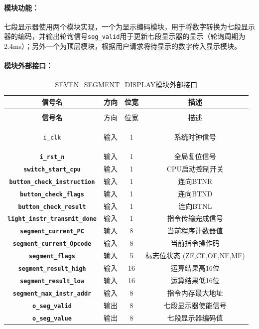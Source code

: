\documentclass[lang=cn,a4paper,newtx]{elegantpaper}
\begin{document}
\paragraph{模块功能：}
七段显示器使用两个模块实现，一个为显示编码模块，用于将数字转换为七段显示器的编码，并输出轮询信号\texttt{seg\_valid}用于更新七段显示器的显示（轮询周期为2.4ms）；另外一个为顶层模块，根据用户请求将待显示的数字传入显示模块。
\paragraph{模块外部接口：}
\begin{longtable}{>{\bfseries}c c c c}
  \caption{SEVEN\_SEGMENT\_DISPLAY模块外部接口} \\ 
  \toprule
  信号名 & 方向 & 位宽 & 描述 \\ 
  \midrule
  \endfirsthead

  \multicolumn{4}{l}{\textbf{（续表）SEVEN\_SEGMENT\_DISPLAY模块外部接口}} \\ 
  \toprule
  信号名 & 方向 & 位宽 & 描述 \\ 
  \midrule
  \endhead

  \texttt{i\_clk} & 输入 & 1 & 系统时钟信号 \\ 
  \texttt{i\_rst\_n} & 输入 & 1 & 全局复位信号 \\ 
  \texttt{switch\_start\_cpu} & 输入 & 1 & CPU启动控制开关 \\ 
  \texttt{button\_check\_instruction} & 输入 & 1 & 连向BTNR \\ 
  \texttt{button\_check\_flags} & 输入 & 1 & 连向BTND \\ 
  \texttt{button\_check\_result} & 输入 & 1 & 连向BTNL \\ 
  \texttt{light\_instr\_transmit\_done} & 输入 & 1 & 指令传输完成信号 \\ 
  \texttt{segment\_current\_PC} & 输入 & 8 & 当前程序计数器值 \\ 
  \texttt{segment\_current\_Opcode} & 输入 & 8 & 当前指令操作码 \\ 
  \texttt{segment\_flags} & 输入 & 5 & 标志位状态 (ZF,CF,OF,NF,MF) \\ 
  \texttt{segment\_result\_high} & 输入 & 16 & 运算结果高16位 \\
  \texttt{segment\_result\_low} & 输入 & 16 & 运算结果低16位 \\
  \texttt{segment\_max\_instr\_addr} & 输入 & 8 & 指令内存最大地址 \\ 
  \texttt{o\_seg\_valid} & 输出 & 8 & 七段显示器使能信号 \\ 
  \texttt{o\_seg\_value} & 输出 & 8 & 七段显示器编码值 \\ 
  \bottomrule
\end{longtable}
\end{document}
